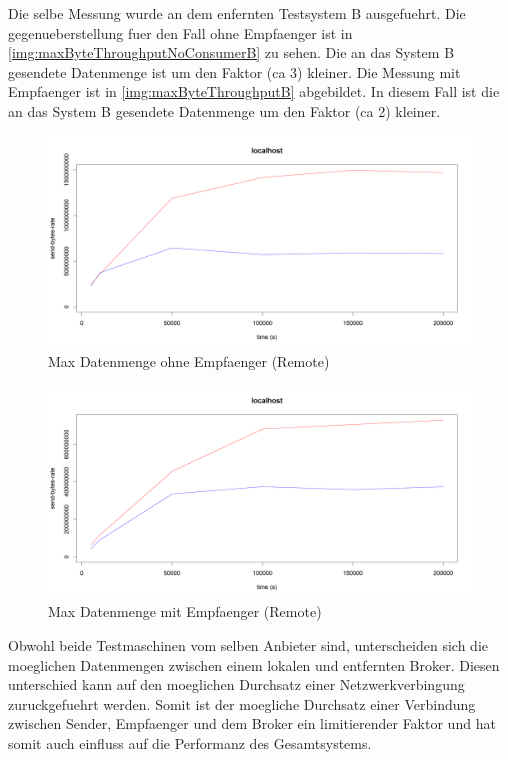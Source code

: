 Die selbe Messung wurde an dem enfernten Testsystem B ausgefuehrt. Die gegenueberstellung fuer den Fall ohne Empfaenger ist in \autoref{img:maxByteThroughputNoConsumerB} zu sehen. Die an das System B gesendete Datenmenge ist um den Faktor (ca 3) kleiner. Die Messung mit Empfaenger ist in \autoref{img:maxByteThroughputB} abgebildet. In diesem Fall ist die an das System B gesendete Datenmenge um den Faktor (ca 2) kleiner.
\begin{figure}
\center
 \includegraphics[width=1\textwidth]{images/measurement/rate-limit-unlimited-no-consumer-AvsB.png}
  \caption{Max Datenmenge ohne Empfaenger (Remote)}
  \label{img:maxByteThroughputNoConsumerB}
\end{figure}
\begin{figure}
\center
 \includegraphics[width=1\textwidth]{images/measurement/rate-limit-unlimited-AvsB.png}
  \caption{Max Datenmenge mit Empfaenger (Remote)}
  \label{img:maxByteThroughputB}
\end{figure}
Obwohl beide Testmaschinen vom selben Anbieter sind, unterscheiden sich die moeglichen Datenmengen zwischen einem lokalen und entfernten Broker. Diesen unterschied kann auf den moeglichen Durchsatz einer Netzwerkverbingung zuruckgefuehrt werden. Somit ist der moegliche Durchsatz einer Verbindung zwischen Sender, Empfaenger und dem Broker ein limitierender Faktor und hat somit auch einfluss auf die Performanz des Gesamtsystems.


